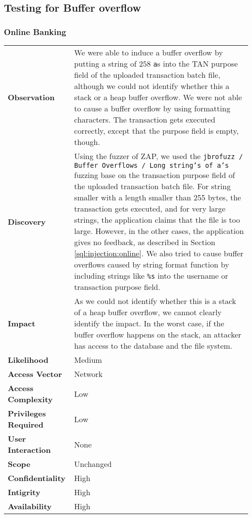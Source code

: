 \subsection{Testing for Buffer overflow}
\subsubsection*{Online Banking}

\begin{tabular}{l|p{10cm}}

\textbf{Observation} & We were able to induce a buffer overflow by putting a string of $258$ \texttt{a}s into the TAN purpose field of the uploaded transaction batch file, although we could not identify whether this a stack or a heap buffer overflow. We were not able to cause a buffer overflow by using formatting characters. The transaction gets executed correctly, except that the purpose field is empty, though. \\
\textbf{Discovery} & Using the fuzzer of ZAP, we used the \texttt{jbrofuzz / Buffer Overflows / Long string's of a's} fuzzing base on the transaction purpose field of the uploaded transaction batch file. For string smaller with a length smaller than 255 bytes, the transaction gets executed, and for very large strings, the application claims that the file is too large. However, in the other cases, the application gives no feedback, as described in Section \ref{sql:injection:online}. We also tried to cause buffer overflows caused by string format function by including strings like \texttt{\%s} into the username or transaction purpose field. \\
\textbf{Impact} & As we could not identify whether this is a stack of a heap buffer overflow, we cannot clearly identify the impact. In the worst case, if the buffer overflow happens on the stack, an attacker has access to the database and the file system. \\
\textbf{Likelihood} & Medium \\
\textbf{Access Vector} & Network \\
\textbf{Access Complexity} & Low \\
\textbf{Privileges Required} & Low \\
\textbf{User Interaction} & None \\
\textbf{Scope} & Unchanged \\
\textbf{Confidentiality} & High \\
\textbf{Intigrity} & High \\
\textbf{Availability} & High \\
\end{tabular}

